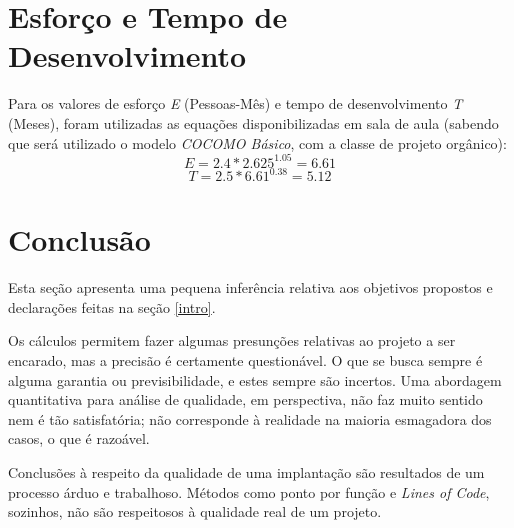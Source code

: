 \documentclass[
10pt, %
a4paper, %
oneside, %
headinclude,footinclude, %
BCOR5mm, %
]{scrartcl}
\begin{document}
\newpage %


\section{Esforço e Tempo de Desenvolvimento}\label{etd}
Para os valores de esforço \textit{E} (Pessoas-Mês) e tempo de desenvolvimento
\textit{T} (Meses), foram utilizadas as equações disponibilizadas em sala de
aula (sabendo que será utilizado o modelo \textit{COCOMO Básico}, com a classe
de projeto orgânico):
\begin{equation}
	E = 2.4 * 2.625^{1.05} = 6.61
\end{equation}
\begin{equation}
	T = 2.5 * 6.61^{0.38} = 5.12
\end{equation}

\newpage %


\section{Conclusão}
Esta seção apresenta uma pequena inferência relativa aos objetivos propostos e
declarações feitas na seção \ref{intro}.

Os cálculos permitem fazer algumas presunções relativas ao projeto
a ser encarado, mas a precisão é certamente questionável. O que se busca sempre
é alguma garantia ou previsibilidade, e estes sempre são incertos. Uma abordagem
quantitativa para análise de qualidade, em perspectiva, não faz muito sentido
nem é tão satisfatória; não corresponde à realidade na maioria esmagadora dos
casos, o que é razoável.

Conclusões à respeito da qualidade de uma implantação são resultados de um
processo árduo e trabalhoso. Métodos como ponto por função e
\textit{Lines of Code}, sozinhos, não são respeitosos à qualidade real de um
projeto.
\end{document}
